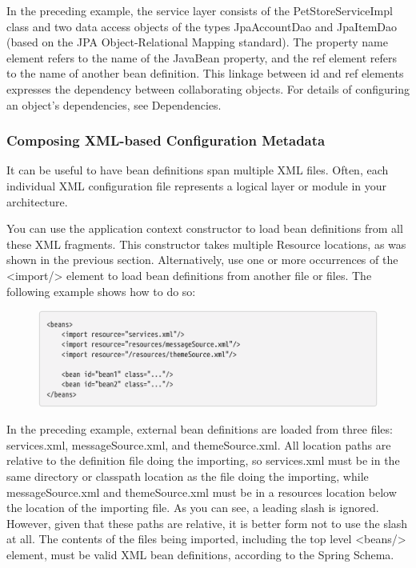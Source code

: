 In the preceding example, the service layer consists of the PetStoreServiceImpl class and two data
access objects of the types JpaAccountDao and JpaItemDao (based on the JPA Object-Relational
Mapping standard). The property name element refers to the name of the JavaBean property, and the
ref element refers to the name of another bean definition. This linkage between id and ref
elements expresses the dependency between collaborating objects. For details of configuring an
object’s dependencies, see Dependencies.

\subsubsection{Composing XML-based Configuration Metadata}
It can be useful to have bean definitions span multiple XML files. Often, each individual XML
configuration file represents a logical layer or module in your architecture.

You can use the application context constructor to load bean definitions from all these XML
fragments. This constructor takes multiple Resource locations, as was shown in the previous section.
Alternatively, use one or more occurrences of the <import/> element to load bean definitions from
another file or files. The following example shows how to do so:

\newpage
\begin{figure}[ht]
\centering
\includegraphics[width=1\linewidth]{./Figure/IMG_code_5.png}
\end{figure}

In the preceding example, external bean definitions are loaded from three files: services.xml,
messageSource.xml, and themeSource.xml. All location paths are relative to the definition file doing
the importing, so services.xml must be in the same directory or classpath location as the file doing
the importing, while messageSource.xml and themeSource.xml must be in a resources location below
the location of the importing file. As you can see, a leading slash is ignored. However, given that
these paths are relative, it is better form not to use the slash at all. The contents of the files being
imported, including the top level <beans/> element, must be valid XML bean definitions, according
to the Spring Schema.

